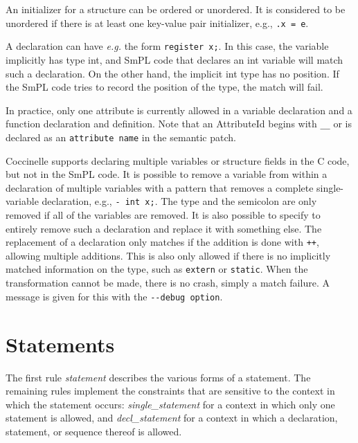 An initializer for a structure can be ordered or unordered.  It is
considered to be unordered if there is at least one key-value pair
initializer, e.g., \texttt{.x = e}.

A declaration can have \textit{e.g.} the form \texttt{register x;}.  In
this case, the variable implicitly has type int, and SmPL code
that declares an int variable will match such a declaration.  On the other
hand, the implicit int type has no position.  If the SmPL code tries to
record the position of the type, the match will fail.

In practice, only one attribute is currently allowed in a variable
declaration and a function declaration and definition.
Note that an AttributeId begins with {\tt \_\_} or is declared as
an {\tt attribute name} in the semantic patch.

Coccinelle supports declaring multiple variables or structure fields in the
C code, but not in the SmPL code.  It is possible to remove a variable from
within a declaration of multiple variables with a pattern that removes a
complete single-variable declaration, e.g., {\tt - int x;}.  The type and
the semicolon are only removed if all of the variables are removed.  It is
also possible to specify to entirely remove such a declaration and replace
it with something else.  The replacement of a declaration only matches if
the addition is done with {\tt ++}, allowing multiple additions.  This is
also only allowed if there is no implicitly matched information on the
type, such as {\tt extern} or {\tt static}.  When the transformation cannot
be made, there is no crash, simply a match failure.  A message is given for
this with the {\tt -{}-debug option}.

\section{Statements}

The first rule {\em statement} describes the various forms of a statement.
The remaining rules implement the constraints that are sensitive to the
context in which the statement occurs: {\em single\_statement} for a
context in which only one statement is allowed, and {\em decl\_statement}
for a context in which a declaration, statement, or sequence thereof is
allowed.

